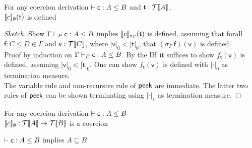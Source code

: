 \begin{lemma}[Termination]
For any coercion derivation $\vdash \mathsf{c} : A \leq B$ and $\mathsf{t} : \mathcal{T}\llbracket A \rrbracket$,\\ 
$\llbracket c \rrbracket_\emptyset(\mathsf{t})$ is defined  %
\end{lemma}
\begin{proof}[Sketch]
Show $\Gamma \vdash_P \mathsf{c} : A \leq B$ implies $\llbracket c \rrbracket_{\sigma_{\Gamma}}(\mathsf{t})$ is defined, assuming that forall $\mathsf{f} : C \leq D \in \Gamma$ and $\mathsf{v} : \mathcal{T}\llbracket C \rrbracket$, where $|\mathsf{v}|_0 < |\mathsf{t}|_0$, that $(\sigma_{\Gamma}~\mathsf{f})(\mathsf{v})$ is defined.\\
Proof by induction on $\Gamma \vdash_P \mathsf{c} : A \leq B$. By the IH it suffices to show $f_{\mathsf{t}}(\mathsf{v})$ is defined, assuming $|\mathsf{v}|_0 < |\mathsf{t}|_0$. One can show $f_{\mathsf{t}}(\mathsf{v})$ is defined with $|\cdot|_0$ as termination measure.\\
The variable rule and non-recursive rule of $\mathsf{peek}$ are immediate. The latter two rules of $\mathsf{peek}$ can be shown terminating using $|\cdot|_1$ as termination measure.
\end{proof}
\begin{lemma}
 For any coercion derivation $\vdash \mathsf{c} : A \leq B$\\ 
$\llbracket c \rrbracket_\emptyset :\mathcal{T}\llbracket A \rrbracket \rightarrow \mathcal{T}\llbracket B \rrbracket$ is a coercion
\end{lemma}
\begin{corollary}[Soundness]
$\vdash \mathsf{c} : A \leq B$ implies $A \subseteq B$
\end{corollary}
